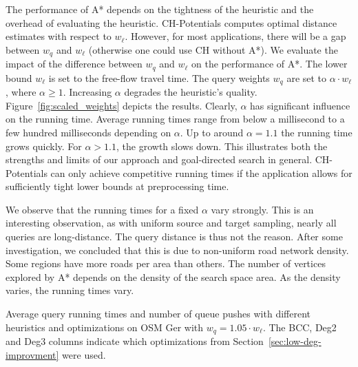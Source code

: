 \documentclass[manuscript,review]{acmart}
\begin{document}
The performance of A* depends on the tightness of the heuristic and the overhead of evaluating the heuristic.
CH-Potentials computes optimal distance estimates with respect to $w_\ell$.
However, for most applications, there will be a gap between $w_q$ and $w_\ell$ (otherwise one could use CH without A*).
We evaluate the impact of the difference between $w_q$ and $w_\ell$ on the performance of A*.
The lower bound $w_\ell$ is set to the free-flow travel time.
The query weights $w_q$ are set to $\alpha \cdot w_\ell$, where $\alpha\ge 1$.
Increasing $\alpha$ degrades the heuristic's quality.
Figure~\ref{fig:scaled_weights} depicts the results.
Clearly, $\alpha$ has significant influence on the running time.
Average running times range from below a millisecond to a few hundred milliseconds depending on $\alpha$.
Up to around $\alpha = 1.1$ the running time grows quickly.
For $\alpha > 1.1$, the growth slows down.
This illustrates both the strengths and limits of our approach and goal-directed search in general.
CH-Potentials can only achieve competitive running times if the application allows for sufficiently tight lower bounds at preprocessing time.

We observe that the running times for a fixed $\alpha$ vary strongly.
This is an interesting observation, as with uniform source and target sampling, nearly all queries are long-distance.
The query distance is thus not the reason.
After some investigation, we concluded that this is due to non-uniform road network density.
Some regions have more roads per area than others.
The number of vertices explored by A* depends on the density of the search space area.
As the density varies, the running times vary.

\begin{table}
\centering
\caption{
Average query running times and number of queue pushes with different heuristics and optimizations on OSM Ger with $w_q = 1.05 \cdot w_\ell$.
The BCC, Deg2 and Deg3 columns indicate which optimizations from Section~\ref{sec:low-deg-improvment} were used.
}\label{tab:building_blocks}

\end{table}
\end{document}
